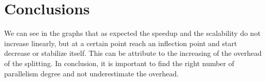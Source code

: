 \documentclass[a4paper,10pt]{article}
\begin{document}
\section{Conclusions}
We can see in the graphs that as expected the speedup and the scalability do not increase linearly, but at a certain point reach an inflection point and start decrease or stabilize itself. This can be attribute to the increasing of the overhead of the splitting. In conclusion, it is important to find the right number of parallelism degree and not underestimate the overhead.
\end{document}
